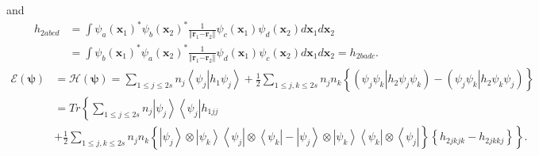 \documentclass[aps,preprint]{revtex4}%
\begin{document}
and
\begin{align}
h_{2abcd}  &  =\int\psi_{a}\left(  \mathbf{x}_{1}\right)  ^{\ast}\psi
_{b}\left(  \mathbf{x}_{2}\right)  ^{\ast}\frac{1}{\left\Vert \mathbf{r}%
_{1}\mathbf{-r}_{2}\right\Vert }\psi_{c}\left(  \mathbf{x}_{1}\right)
\psi_{d}\left(  \mathbf{x}_{2}\right)  d\mathbf{x}_{1}d\mathbf{x}%
_{2}\nonumber\\
&  =\int\psi_{b}\left(  \mathbf{x}_{1}\right)  ^{\ast}\psi_{a}\left(
\mathbf{x}_{2}\right)  ^{\ast}\frac{1}{\left\Vert \mathbf{r}_{1}%
\mathbf{-r}_{2}\right\Vert }\psi_{d}\left(  \mathbf{x}_{1}\right)  \psi
_{c}\left(  \mathbf{x}_{2}\right)  d\mathbf{x}_{1}d\mathbf{x}_{2}=h_{2badc}.
\end{align}%
\begin{align}
\mathcal{E}\left(  \mathbf{\psi}\right)   &  =\mathcal{H}\left(  \mathbf{\psi
}\right)  =\sum_{1\leq j\leq2s}n_{j}\left\langle \psi_{j}\right\vert
h_{1}\left.  \psi_{j}\right\rangle +\frac{1}{2}\sum_{1\leq j,k\leq2s}%
n_{j}n_{k}\left\{  \left(  \left.  \psi_{j}\psi_{k}\right\vert h_{2}\psi
_{j}\psi_{k}\right)  -\left(  \left.  \psi_{j}\psi_{k}\right\vert h_{2}%
\psi_{k}\psi_{j}\right)  \right\} \nonumber\\
&  =Tr\left\{  \sum_{1\leq j\leq2s}n_{j}\left\vert \psi_{j}\right\rangle
\left\langle \psi_{j}\right\vert h_{1jj}\right. \nonumber\\
&  +\left.  \frac{1}{2}\sum_{1\leq j,k\leq2s}n_{j}n_{k}\left\{  \left\vert
\psi_{j}\right\rangle \otimes\left\vert \psi_{k}\right\rangle \left\langle
\psi_{j}\right\vert \otimes\left\langle \psi_{k}\right\vert -\left\vert
\psi_{j}\right\rangle \otimes\left\vert \psi_{k}\right\rangle \left\langle
\psi_{k}\right\vert \otimes\left\langle \psi_{j}\right\vert \right\}  \left\{
h_{2jkjk}-h_{2jkkj}\right\}  \right\}  .
\end{align}
\end{document}
